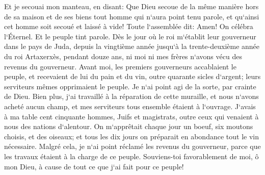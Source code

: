 \verse Et je secouai mon manteau, en disant: Que Dieu secoue de la même manière hors de sa maison et de ses biens tout homme qui n`aura point tenu parole, et qu`ainsi cet homme soit secoué et laissé à vide! Toute l`assemblée dit: Amen! On célébra l`Éternel. Et le peuple tint parole. 
\verse Dès le jour où le roi m`établit leur gouverneur dans le pays de Juda, depuis la vingtième année jusqu`à la trente-deuxième année du roi Artaxerxès, pendant douze ans, ni moi ni mes frères n`avons vécu des revenus du gouverneur. 
\verse Avant moi, les premiers gouverneurs accablaient le peuple, et recevaient de lui du pain et du vin, outre quarante sicles d`argent; leurs serviteurs mêmes opprimaient le peuple. Je n`ai point agi de la sorte, par crainte de Dieu. 
\verse Bien plus, j`ai travaillé à la réparation de cette muraille, et nous n`avons acheté aucun champ, et mes serviteurs tous ensemble étaient à l`ouvrage. 
\verse J`avais à ma table cent cinquante hommes, Juifs et magistrats, outre ceux qui venaient à nous des nations d`alentour. 
\verse On m`apprêtait chaque jour un boeuf, six moutons choisis, et des oiseaux; et tous les dix jours on préparait en abondance tout le vin nécessaire. Malgré cela, je n`ai point réclamé les revenus du gouverneur, parce que les travaux étaient à la charge de ce peuple. 
\verse Souviens-toi favorablement de moi, ô mon Dieu, à cause de tout ce que j`ai fait pour ce peuple! 

